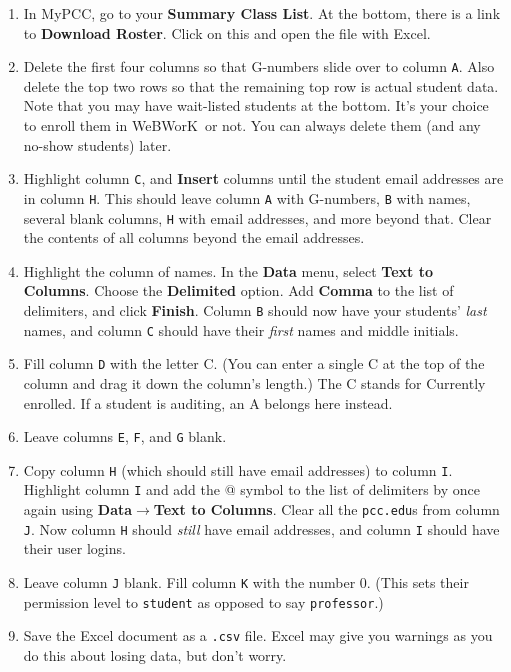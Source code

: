 \documentclass[12pt]{article}
\newcommand{\menu}[1]{\textbf{#1}}
\newcommand{\WW}{WeBWorK}
\begin{document}
\begin{enumerate}
\item In MyPCC, go to your \menu{Summary Class List}. At the bottom, there is a link to \menu{Download Roster}. Click on this and open the file with Excel.
\item Delete the first four columns so that G-numbers slide over to column \texttt{A}. Also delete the top two rows so that the remaining top row is actual student data. Note that you may have wait-listed students at the bottom. It's your choice to enroll them in \WW\ or not. You can always delete them (and any no-show students) later.
\item Highlight column \texttt{C}, and \menu{Insert} columns until the student email addresses are in column \texttt{H}. This should leave column \texttt{A} with G-numbers, \texttt{B} with names, several blank columns, \texttt{H} with email addresses, and more beyond that. Clear the contents of all columns beyond the email addresses.
\item Highlight the column of names. In the \menu{Data} menu, select \menu{Text to Columns}. Choose the \menu{Delimited} option. Add \menu{Comma} to the list of delimiters, and click \menu{Finish}. Column \texttt{B} should now have your students' \emph{last} names, and column \texttt{C} should have their \emph{first} names and middle initials.
\item Fill column \texttt{D} with the letter C. (You can enter a single C at the top of the column and drag it down the column's length.) The C stands for Currently enrolled. If a student is auditing, an A belongs here instead.
\item Leave columns \texttt{E}, \texttt{F}, and \texttt{G} blank.
\item Copy column \texttt{H} (which should still have email addresses) to column \texttt{I}. Highlight column \texttt{I} and add the
@ symbol to the list of delimiters by once again using \menu{Data}$\rightarrow$\menu{Text to Columns}. Clear all the \texttt{pcc.edu}s from column \texttt{J}. Now column \texttt{H} should \emph{still} have email addresses, and column \texttt{I} should have their user logins.
\item Leave column \texttt{J} blank. Fill column \texttt{K} with the number 0. (This sets their permission level to \texttt{student}
as opposed to say \texttt{professor}.)
\item Save the Excel document as a \texttt{.csv} file. Excel may give you warnings as you do this about losing data, but don't worry.
\end{enumerate}
\end{document}
